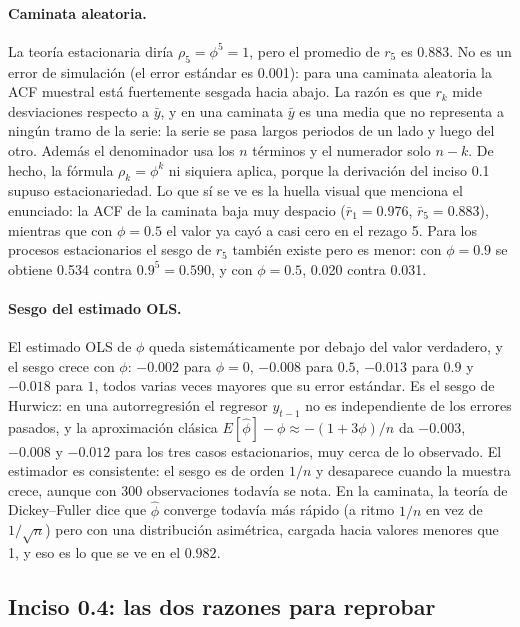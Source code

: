 \paragraph{Caminata aleatoria.} La teoría estacionaria diría $\rho_5=\phi^5=1$,
pero el promedio de $r_5$ es 0.883. No es un error de simulación (el error
estándar es 0.001): para una caminata aleatoria la ACF muestral está
fuertemente sesgada hacia abajo. La razón es que $r_k$ mide desviaciones
respecto a $\bar y$, y en una caminata $\bar y$ es una media que no
representa a ningún tramo de la serie: la serie se pasa largos periodos de un
lado y luego del otro. Además el denominador usa los $n$ términos y el
numerador solo $n-k$. De hecho, la fórmula $\rho_k=\phi^k$ ni siquiera
aplica, porque la derivación del inciso 0.1 supuso estacionariedad. Lo que sí
se ve es la huella visual que menciona el enunciado: la ACF de la caminata
baja muy despacio ($\bar r_1=0.976$, $\bar r_5=0.883$), mientras que con
$\phi=0.5$ el valor ya cayó a casi cero en el rezago 5. Para los procesos
estacionarios el sesgo de $r_5$ también existe pero es menor: con $\phi=0.9$
se obtiene 0.534 contra $0.9^5=0.590$, y con $\phi=0.5$, 0.020 contra 0.031.

\paragraph{Sesgo del estimado OLS.} El estimado OLS de $\phi$ queda
sistemáticamente por debajo del valor verdadero, y el sesgo crece con $\phi$:
$-0.002$ para $\phi=0$, $-0.008$ para $0.5$, $-0.013$ para $0.9$ y $-0.018$
para $1$, todos varias veces mayores que su error estándar. Es el sesgo de
Hurwicz: en una autorregresión el regresor $y_{t-1}$ no es independiente de
los errores pasados, y la aproximación clásica $E[\hat\phi]-\phi\approx
-(1+3\phi)/n$ da $-0.003$, $-0.008$ y $-0.012$ para los tres casos
estacionarios, muy cerca de lo observado. El estimador es consistente: el
sesgo es de orden $1/n$ y desaparece cuando la muestra crece, aunque con 300
observaciones todavía se nota. En la caminata, la teoría de Dickey--Fuller
dice que $\hat\phi$ converge todavía más rápido (a ritmo $1/n$ en vez de
$1/\sqrt n$) pero con una distribución asimétrica, cargada hacia valores
menores que 1, y eso es lo que se ve en el $0.982$.

\subsection{Inciso 0.4: las dos razones para reprobar}

